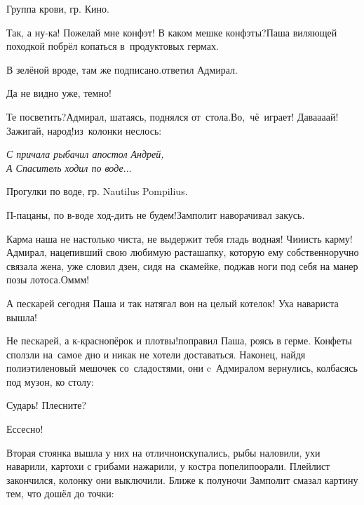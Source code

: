 {\raggedleft \scriptsize \mdash Группа крови, гр. Кино. \par}

\vspace{0.1cm}

\diagdash Так, а ну-ка! Пожелай мне конфэт! В каком мешке конфэты?\mdash Паша виляющей походкой побрёл копаться в~продуктовых гермах.

\diagdash В зелёной вроде, там же подписано.\mdash ответил Адмирал.

\diagdash Да не видно уже, темно!

\diagdash Те посветить?\mdash Адмирал, шатаясь, поднялся от~стола.\mdash Во,~чё~играет! Дава\sdash а\sdash а\sdash ай! Зажигай, народ!\mdash из~колонки неслось:

\vspace{0.1cm}
\noindent\textit{%
	\hspace*{2.5cm}С причала рыбачил апостол Андрей,\\	
	\hspace*{2.5cm}А Спаситель ходил по воде$\ldots$%
}

{\raggedleft \scriptsize \mdash Прогулки по воде, гр. Nautilus Pompilius. \par}

\vspace{0.1cm}

\diagdash П-пацаны, по в-воде ход-дить не будем!\mdash Замполит наворачивал закусь.

\diagdash Карма наша не настолько чиста, не выдержит тебя гладь водная! Чи\sdash и\sdash исть карму!\mdash Адмирал, нацепивший свою любимую раста\sdash шапку, которую ему собственноручно связала жена, уже словил дзен, сидя на~скамейке, поджав ноги под себя на манер позы лотоса.\mdash Ом\sdash м\sdash м!

\diagdash А пескарей сегодня Паша и так натягал вон на целый котелок! Уха навариста вышла!

\diagdash Не пескарей, а к-краснопёрок и плотвы!\mdash поправил Паша, роясь в герме. Конфеты сползли на~самое дно и никак не хотели доставаться. Наконец, найдя полиэтиленовый мешочек со~сладостями, они c~Адмиралом вернулись, колбасясь под музон, ко столу:

\diagdash Сударь! Плесните?

\diagdash Ессесно!

Вторая стоянка вышла у них на отлично\mdash искупались, рыбы наловили, ухи наварили, картохи с грибами нажарили, у костра попели\sdash поорали. Плейлист закончился, колонку они выключили. Ближе к полуночи Замполит смазал картину тем, что дошёл до точки:

